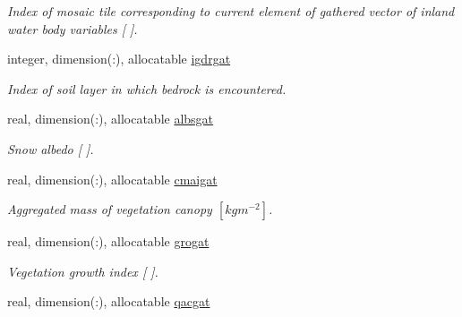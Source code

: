 \begin{DoxyCompactItemize}
\begin{DoxyCompactList}\small\item\em Index of mosaic tile corresponding to current element of gathered vector of inland water body variables \mbox{[} \mbox{]}. \end{DoxyCompactList}\item 
\hypertarget{structclass__statevars_1_1class__gather_af4037019a861fe4c05ca107b208a8021}{}integer, dimension(\+:), allocatable \hyperlink{structclass__statevars_1_1class__gather_af4037019a861fe4c05ca107b208a8021}{igdrgat}\label{structclass__statevars_1_1class__gather_af4037019a861fe4c05ca107b208a8021}

\begin{DoxyCompactList}\small\item\em Index of soil layer in which bedrock is encountered. \end{DoxyCompactList}\item 
\hypertarget{structclass__statevars_1_1class__gather_aedc8f015166e893abba041bc35271e09}{}real, dimension(\+:), allocatable \hyperlink{structclass__statevars_1_1class__gather_aedc8f015166e893abba041bc35271e09}{albsgat}\label{structclass__statevars_1_1class__gather_aedc8f015166e893abba041bc35271e09}

\begin{DoxyCompactList}\small\item\em Snow albedo \mbox{[} \mbox{]}. \end{DoxyCompactList}\item 
\hypertarget{structclass__statevars_1_1class__gather_a5dcba3e6fc5488ecb2b15ffd389ad653}{}real, dimension(\+:), allocatable \hyperlink{structclass__statevars_1_1class__gather_a5dcba3e6fc5488ecb2b15ffd389ad653}{cmaigat}\label{structclass__statevars_1_1class__gather_a5dcba3e6fc5488ecb2b15ffd389ad653}

\begin{DoxyCompactList}\small\item\em Aggregated mass of vegetation canopy $[kg m^{-2} ]$. \end{DoxyCompactList}\item 
\hypertarget{structclass__statevars_1_1class__gather_a115dcc86273a60a5e8470afce4863f4e}{}real, dimension(\+:), allocatable \hyperlink{structclass__statevars_1_1class__gather_a115dcc86273a60a5e8470afce4863f4e}{grogat}\label{structclass__statevars_1_1class__gather_a115dcc86273a60a5e8470afce4863f4e}

\begin{DoxyCompactList}\small\item\em Vegetation growth index \mbox{[} \mbox{]}. \end{DoxyCompactList}\item 
\hypertarget{structclass__statevars_1_1class__gather_a7a62f72edfe6898a7ebc6a7830cfc537}{}real, dimension(\+:), allocatable \hyperlink{structclass__statevars_1_1class__gather_a7a62f72edfe6898a7ebc6a7830cfc537}{qacgat}\label{structclass__statevars_1_1class__gather_a7a62f72edfe6898a7ebc6a7830cfc537}


\end{DoxyCompactItemize}
